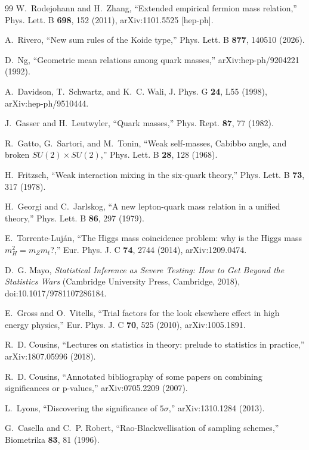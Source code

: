 \documentclass[aps,twocolumn,superscriptaddress,nofootinbib,floatfix]{revtex4-2}
\begin{document}
\begin{thebibliography}{99}
W.~Rodejohann and H.~Zhang, ``Extended empirical fermion mass relation,'' Phys. Lett. B \textbf{698}, 152 (2011), arXiv:1101.5525 [hep-ph].

A.~Rivero, ``New sum rules of the Koide type,'' Phys. Lett. B \textbf{877}, 140510 (2026).

D.~Ng, ``Geometric mean relations among quark masses,'' arXiv:hep-ph/9204221 (1992).

A.~Davidson, T.~Schwartz, and K.~C. Wali, J. Phys. G \textbf{24}, L55 (1998), arXiv:hep-ph/9510444.

J.~Gasser and H.~Leutwyler, ``Quark masses,'' Phys. Rept. \textbf{87}, 77 (1982).

R.~Gatto, G.~Sartori, and M.~Tonin, ``Weak self-masses, Cabibbo angle, and broken $SU(2)\times SU(2)$,'' Phys. Lett. B \textbf{28}, 128 (1968).

H.~Fritzsch, ``Weak interaction mixing in the six-quark theory,'' Phys. Lett. B \textbf{73}, 317 (1978).

H.~Georgi and C.~Jarlskog, ``A new lepton-quark mass relation in a unified theory,'' Phys. Lett. B \textbf{86}, 297 (1979).

E.~Torrente-Luj\'an, ``The Higgs mass coincidence problem: why is the Higgs mass $m_H^2=m_Z m_t$?,'' Eur. Phys. J. C \textbf{74}, 2744 (2014), arXiv:1209.0474.

D.~G. Mayo, \emph{Statistical Inference as Severe Testing: How to Get Beyond the Statistics Wars} (Cambridge University Press, Cambridge, 2018), doi:10.1017/9781107286184.

E.~Gross and O.~Vitells, ``Trial factors for the look elsewhere effect in high energy physics,'' Eur. Phys. J. C \textbf{70}, 525 (2010), arXiv:1005.1891.

R.~D. Cousins, ``Lectures on statistics in theory: prelude to statistics in practice,'' arXiv:1807.05996 (2018).

R.~D. Cousins, ``Annotated bibliography of some papers on combining significances or p-values,'' arXiv:0705.2209 (2007).

L.~Lyons, ``Discovering the significance of $5\sigma$,'' arXiv:1310.1284 (2013).

G.~Casella and C.~P. Robert, ``Rao-Blackwellisation of sampling schemes,'' Biometrika \textbf{83}, 81 (1996).


\end{thebibliography}
\end{document}
